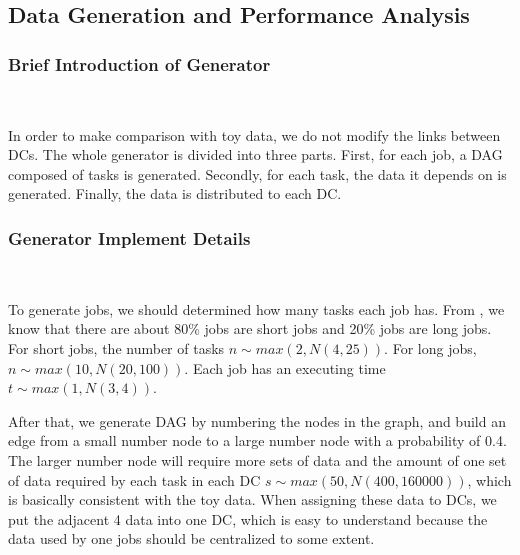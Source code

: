 \subsection{Data Generation and Performance Analysis}\label{data generator}
\subsubsection{Brief Introduction of Generator}
~\par
In order to make comparison with toy data, we do not modify the links between DCs. The whole generator is divided into three parts. First, for each job, a DAG composed of tasks is generated. Secondly, for each task, the data it depends on is generated. Finally, the data is distributed to each DC.
\subsubsection{Generator Implement Details}
~\par
To generate jobs, we should determined how many tasks each job has. From \cite{OSC}, we know that there are about 80\% jobs are short jobs and 20\% jobs are long jobs. For short jobs, the number of tasks $n\sim max(2,N(4,25))$. For long jobs, $n\sim max(10,N(20,100))$. Each job has an executing time $t\sim max(1,N(3,4))$.

After that, we generate DAG by numbering the nodes in the graph, and build an edge from a small number node to a large number node with a probability of 0.4. The larger number node will require more sets of data and the amount of one set of data required by each task in each DC $s\sim max(50,N(400,160000))$, which is basically consistent with the toy data. When assigning these data to DCs, we put the adjacent 4 data into one DC, which is easy to understand because the data used by one jobs should be centralized to some extent.




